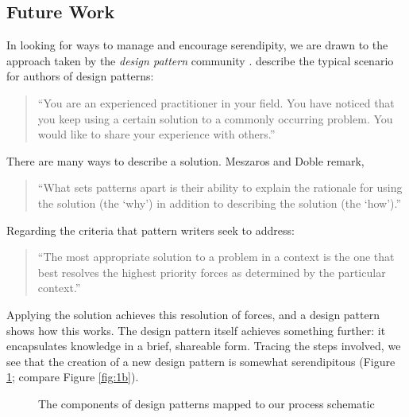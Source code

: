 \subsection{Future Work} \label{sec:futurework} \label{sec:hatching}

In looking for ways to manage and encourage serendipity, we are drawn
to the approach taken by the \emph{design pattern} community
\cite{alexander1999origins}. 
 describe the typical scenario for authors of design patterns:

\begin{quote}
\noindent ``You are an experienced practitioner in your field.  You
have noticed that you keep using a certain solution to a commonly
occurring problem.  You would like to share your experience with
others.''
\end{quote}
There are many ways to describe a solution.
Meszaros and Doble remark,
\begin{quote}
\noindent ``What sets patterns apart is their ability to explain the
rationale for using the solution (the `why') in addition to describing
the solution (the `how').''
\end{quote}
Regarding the criteria that pattern writers seek to address: 
\begin{quote}
\noindent ``The most appropriate solution to a problem in a context is
the one that best resolves the highest priority forces as determined
by the particular context.''
\end{quote}

%
%
Applying the solution achieves this resolution of forces, and a design
pattern shows how this works.  The design pattern itself achieves
something further: it encapsulates knowledge in a brief, shareable
form.  Tracing
the steps involved, we see that the creation of a new design pattern
is somewhat serendipitous (Figure \ref{fig:pattern-schematic};
compare Figure \ref{fig:1b}).  

\begin{figure}

\caption{The components of design patterns mapped to our process schematic\label{fig:pattern-schematic}}
\end{figure}

